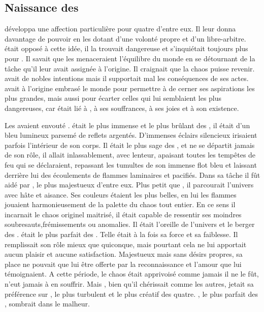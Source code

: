 \subsection{Naissance des \Dormus}

\Mey développa une affection particulière pour quatre d'entre eux. Il leur donna davantage de pouvoir en les dotant d'une volonté propre et d'un libre-arbitre. \Cind était opposé à cette idée, il la trouvait dangereuse et s'inquiétait toujours plus pour \Mey. Il savait que les \Dormus menaceraient l'équilibre du monde en se détournant de la tâche qu'il leur avait assignée à l'origine. Il craignait que la chaos puisse revenir. \Mey avait de nobles intentions mais il supportait mal les conséquences de ses actes. \Cind avait à l'origine embrasé le monde pour permettre à \Mey de cerner ses aspirations les plus grandes, mais aussi pour écarter celles qui lui semblaient les plus dangereuses, car \Cind était lié à \Mey, à ses souffrances, à ses joies et à son existence.

Les \Dormus avaient envouté \Mey. \Boromu était le plus immense et le plus brûlant des \SC, il était d'un bleu lumineux parsemé de reflets argentés. D'immenses éclairs silencieux irisaient parfois l'intérieur de son corps. Il était le plus sage des \Dormus, et ne se départit jamais de son rôle, il allait inlassablement, avec lenteur, apaisant toutes les tempêtes de feu qui se déclaraient, repassant les tumultes de son immense flot bleu et laissant derrière lui des écoulements de flammes laminaires et pacifiés. Dans sa tâche il fût aidé par \Esu, le plus majestueux d'entre eux. Plus petit que \Boromu, il parcourait l'univers avec hâte et aisance. Ses couleurs étaient les plus belles, en lui les flammes jouaient harmonieusement de la palette du chaos tout entier. En ce sens il incarnait le chaos originel maitrisé, il était capable de ressentir ses moindres soubresauts,frémissements ou anomalies. Il était l'oreille de l'univers et le berger des \SC. \Esu était le plus parfait des \Dormus. Telle était à la fois sa force et sa faiblesse. Il remplissait son rôle mieux que quiconque, mais pourtant cela ne lui apportait aucun plaisir et aucune satisfaction. Majestueux mais sans désirs propres, sa place ne pouvait que lui être offerte par la reconnaissance et l'amour que \Mey lui témoignaient. A cette période, le chaos était apprivoisé comme jamais il ne le fût, \Mey n'eut jamais à en souffrir. Mais \Mey, bien qu'il chérissait \Esu comme les autres, jetait sa préférence sur \Ogo, le plus turbulent et le plus créatif des quatre. \Esu, le plus parfait des \Dormus, sombrait dans le malheur.


